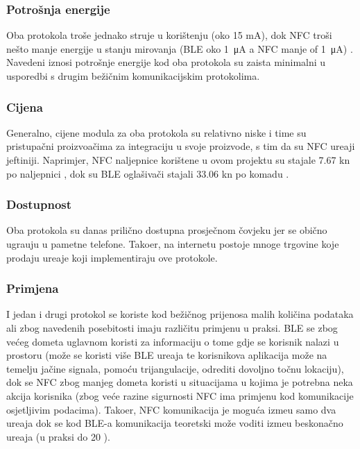 \subsubsection{Potro\v{s}nja energije}
Oba protokola tro\v{s}e jednako struje u kori\v{s}tenju (oko 15 mA), dok NFC tro\v{s}i ne\v{s}to manje energije u stanju mirovanja (BLE oko \SI{1}{\micro\ampere} a NFC manje of \SI{1}{\micro\ampere}) \cite{mobilePayments}. Navedeni iznosi potro\v{s}nje energije kod oba protokola su zaista minimalni u usporedbi s drugim be\v{z}i\v{c}nim komunikacijskim protokolima.


\subsubsection{Cijena}
Generalno, cijene modula za oba protokola su relativno niske i time su pristupa\v{c}ni proizvo\dj a\v{c}ima za integraciju u svoje proizvode, s tim da su NFC ure\dj aji jeftiniji. Naprimjer, NFC naljepnice kori\v{s}tene u ovom projektu su stajale 7.67 kn po naljepnici \cite{whiztags}, dok su BLE ogla\v{s}iva\v{c}i stajali 33.06 kn po komadu \cite{gimbal_beacon}.

\subsubsection{Dostupnost}
Oba protokola su danas prili\v{c}no dostupna prosje\v{c}nom \v{c}ovjeku jer se obi\v{c}no ugra\dj uju u pametne telefone. Tako\dj er, na internetu postoje mnoge trgovine koje prodaju ure\dj aje koji implementiraju ove protokole.

\subsubsection{Primjena}
I jedan i drugi protokol se koriste kod be\v{z}i\v{c}nog prijenosa malih koli\v{c}ina podataka ali zbog navedenih posebitosti imaju razli\v{c}itu primjenu u praksi. BLE se zbog ve\'{c}eg dometa uglavnom koristi za informaciju o tome gdje se korisnik nalazi u prostoru (mo\v{z}e se koristi vi\v{s}e BLE ure\dj aja te korisnikova aplikacija mo\v{z}e na temelju ja\v{c}ine signala, pomo\'{c}u trijangulacije, odrediti dovoljno to\v{c}nu lokaciju), dok se NFC zbog manjeg dometa koristi u situacijama u kojima je potrebna neka akcija korisnika (zbog ve\'{c}e razine sigurnosti NFC ima primjenu kod komunikacije osjetljivim podacima). Tako\dj er, NFC komunikacija je mogu\'{c}a izme\dj u samo dva ure\dj aja dok se kod BLE-a komunikacija teoretski mo\v{z}e voditi izme\dj u beskona\v{c}no ure\dj aja (u praksi do 20 \cite{mobilePayments}). 


